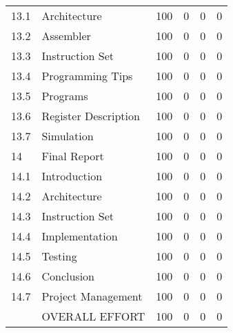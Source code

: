 \begin{table}
\begin{tabular}{p{1cm}p{5cm}p{1.5cm}p{1.5cm}p{1.5cm}p{1.5cm}}
13.1  & Architecture					& 100	& 0	& 0 	& 0 \\  
13.2  & Assembler					& 100	& 0	& 0 	& 0 \\  
13.3  & Instruction Set					& 100	& 0	& 0 	& 0 \\  
13.4  & Programming Tips				& 100	& 0	& 0 	& 0 \\  
13.5  & Programs					& 100	& 0	& 0 	& 0 \\  
13.6  & Register Description				& 100	& 0	& 0 	& 0 \\  
13.7  & Simulation					& 100	& 0	& 0 	& 0 \\ \hline 
14    & Final Report					& 100	& 0	& 0 	& 0 \\  
14.1  & Introduction 					& 100	& 0	& 0 	& 0 \\  
14.2  & Architecture 					& 100	& 0	& 0 	& 0 \\  
14.3  & Instruction Set 				& 100	& 0	& 0 	& 0 \\  
14.4  & Implementation 					& 100	& 0	& 0 	& 0 \\  
14.5  & Testing 					& 100	& 0	& 0 	& 0 \\  
14.6  & Conclusion 					& 100	& 0	& 0 	& 0 \\  
14.7  & Project Management 				& 100	& 0	& 0 	& 0 \\ \hline 
      &  OVERALL EFFORT					& 100	& 0	& 0 	& 0 \\ \hline 
\end{tabular}
\end{table}
